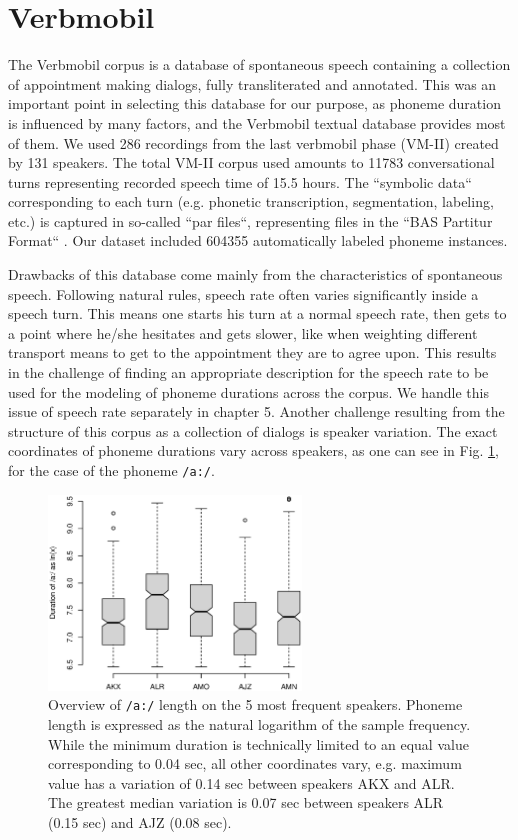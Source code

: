 \documentclass[11pt,a4paper]{scrbook}
\begin{document}
\section{Verbmobil}
The Verbmobil corpus is a database of spontaneous speech containing a collection of appointment making dialogs, fully transliterated and annotated. This was an important point in selecting this database for our purpose, as phoneme duration is influenced by many factors, and the Verbmobil textual database provides most of them. We used 286 recordings from the last verbmobil phase (VM-II) created by 131 speakers. The total VM-II corpus used amounts to 11783 conversational turns representing recorded speech time of 15.5 hours. The ``symbolic data`` corresponding to each turn (e.g. phonetic transcription, segmentation, labeling, etc.) is captured in so-called ``par files``, representing files in the ``BAS Partitur Format`` \cite{Burger2000}. Our dataset included 604355 automatically labeled phoneme instances.

Drawbacks of this database come mainly from the characteristics of spontaneous speech. Following natural rules, speech rate often varies significantly inside a speech turn. This means one starts his turn at a normal speech rate, then gets to a point where he/she hesitates and gets slower, like when weighting different transport means to get to the appointment they are to agree upon. This results in the challenge of finding an appropriate description for the speech rate to be used for the modeling of phoneme durations across the corpus. We handle this issue of speech rate separately in chapter 5. Another challenge resulting from the structure of this corpus as a collection of dialogs is speaker variation. The exact coordinates of phoneme durations vary across speakers, as one can see in Fig. \ref{fig:speaker_cmp}, for the case of the phoneme \texttt{/a:/}.

\begin{figure}[htbp]
	\includegraphics[width=0.6\textwidth]{../Graphen/Duration_of_a_5speakers.eps}
	\centering
	\caption[Phoneme length variation between speakers]{Overview of \texttt{/a:/} length on the 5 most frequent speakers. Phoneme length is expressed as the natural logarithm of the sample frequency. While the minimum duration is technically limited to an equal value corresponding to 0.04 sec, all other coordinates vary, e.g. maximum value has a variation of 0.14 sec between speakers AKX and ALR. The greatest median variation is 0.07 sec between speakers ALR (0.15 sec) and AJZ (0.08 sec).}
	\label{fig:speaker_cmp}
\end{figure}
\end{document}
